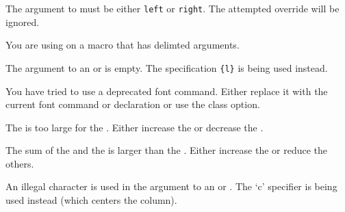 \begin{plainlist}
    The argument to \cmd{\overridesidecapmargin} must be either
\texttt{left} or \texttt{right}. The attempted override will be ignored.


\item[]

   You are using  on a macro that has delimted arguments.

\item[] 

    The argument to an  or  is empty. The
specification \verb?{l}? is being used instead.

\item[]

    You have tried to use a deprecated font command. Either replace
it with the current font command or declaration or use 
the  class option.

\item[]

    The \lnc{\footskip} is too large for the \lnc{\lowermargin}. Either
increase the \lnc{\lowermargin} or decrease the \lnc{\footskip}.


\item[]

        The sum of the \lnc{\headheight} and the \lnc{\headsep} is
  larger than the \lnc{\uppermargin}. Either increase the \lnc{\uppermargin}
  or reduce the others.


\item[]

    An illegal character is used in the argument to an 
or . The `c' specifier is being used instead 
(which centers the column).


\item[] 


\end{plainlist}
